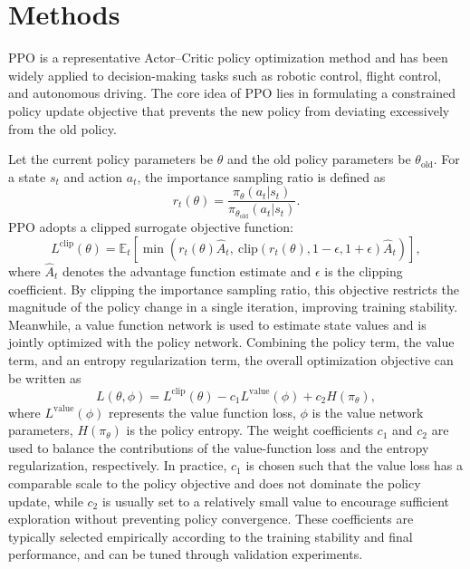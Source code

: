 \documentclass[pdflatex,sn-mathphys-num]{sn-jnl}%
\theoremstyle{thmstyleone}%
\theoremstyle{thmstyletwo}%
\theoremstyle{thmstylethree}%
\begin{document}
\section{Methods}
\label{sec:RL_training}

PPO \cite{PPO} is a representative Actor--Critic policy optimization method and has been widely applied to decision-making tasks such as robotic control, flight control, and autonomous driving. The core idea of PPO lies in formulating a constrained policy update objective that prevents the new policy from deviating excessively from the old policy.

Let the current policy parameters be $\theta$ and the old policy parameters be $\theta_{\mathrm{old}}$. For a state $s_t$ and action $a_t$, the importance sampling ratio is defined as
\begin{equation}
r_t(\theta)=\frac{\pi_{\theta}(a_t|s_t)}{\pi_{\theta_{\mathrm{old}}}(a_t|s_t)}.
\end{equation}
PPO adopts a clipped surrogate objective function:
\begin{equation}
L^{\mathrm{clip}}(\theta)=\mathbb{E}_t\left[\min\left(r_t(\theta)\hat{A}_t,\ \mathrm{clip}(r_t(\theta),1-\epsilon,1+\epsilon)\hat{A}_t\right)\right],
\end{equation}
where $\hat{A}_t$ denotes the advantage function estimate and $\epsilon$ is the clipping coefficient.
By clipping the importance sampling ratio, this objective restricts the magnitude of the policy change in a single iteration, improving training stability. Meanwhile, a value function network is used to estimate state values and is jointly optimized with the policy network. Combining the policy term, the value term, and an entropy regularization term, the overall optimization objective can be written as
\begin{equation}
L(\theta,\phi)=L^{\mathrm{clip}}(\theta)-c_1L^{\mathrm{value}}(\phi)+c_2H(\pi_{\theta}),
\end{equation}
where $L^{\mathrm{value}}(\phi)$ represents the value function loss, $\phi$ is the value network parameters, $H(\pi_{\theta})$ is the policy entropy. The weight coefficients $c_1$ and $c_2$ are used to balance the contributions of the value-function loss and the entropy regularization, respectively. In practice, $c_1$ is chosen such that the value loss has a comparable scale to the policy objective and does not dominate the policy update, while $c_2$ is usually set to a relatively small value to encourage sufficient exploration without preventing policy convergence. These coefficients are typically selected empirically according to the training stability and final performance, and can be tuned through validation experiments. 
\end{document}
